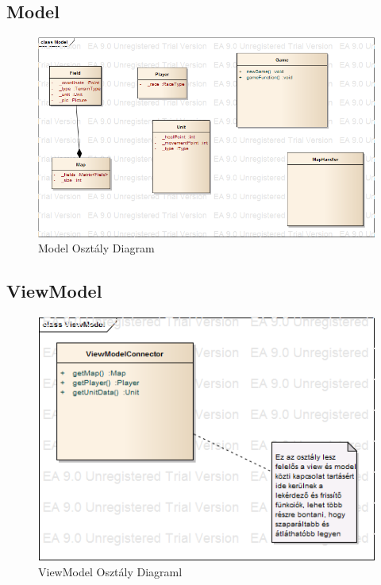 \documentclass[a4paper,12pt]{report}
\begin{document}
\subsection{Model}

\begin{figure}[hbtp]
\centering
\includegraphics[width=1\textwidth]{ModelClass.png}
\caption{Model Osztály Diagram}
\label{fig:mc}
\end{figure}

\subsection{ViewModel}

\begin{figure}[hbtp]
\centering
\includegraphics[width=1\textwidth]{ViewModelClass.png}
\caption{ViewModel Osztály Diagraml}
\label{fig:vmc}
\end{figure}
\end{document}

